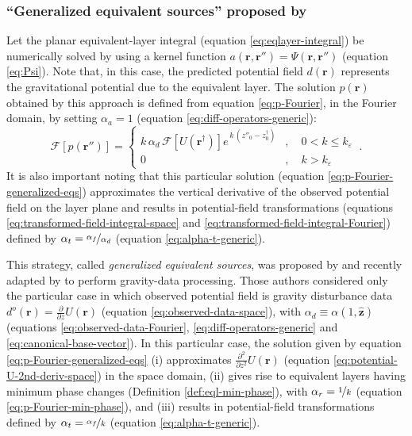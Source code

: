 \subsubsection{``Generalized equivalent sources'' proposed by \citet{cordell1992}}

Let the planar equivalent-layer integral (equation \ref{eq:eqlayer-integral}) be numerically solved by
using a kernel function $a(\mathbf{r}, \mathbf{r}'') = \Psi(\mathbf{r}, \mathbf{r}'')$ (equation \ref{eq:Psi}). 
Note that, in this case, the predicted potential field $d(\mathbf{r})$ 
represents the gravitational potential due to the equivalent layer.
The solution $p(\mathbf{r})$ obtained by this approach is defined from equation \ref{eq:p-Fourier}, in the Fourier domain, 
by setting $\alpha_{a} = 1$ (equation \ref{eq:diff-operators-generic}):
\begin{equation}
	\mathcal{F} [ p(\mathbf{r}'') ] =
	\begin{cases}
		k \, \alpha_{d} \, \mathcal{F} \left[ U(\mathbf{r}^{\dagger}) \right] 
		e^{\, k \, (z''_{0} - z^{\dagger}_{0})} & , 
		\quad 0 < k \le k_{\varepsilon} \\
		0 & , \quad k > k_{\varepsilon} 
	\end{cases} \: .
	\label{eq:p-Fourier-generalized-eqs}
\end{equation}
It is also important noting that 
this particular solution (equation \ref{eq:p-Fourier-generalized-eqs}) approximates the vertical derivative of the observed 
potential field on the layer plane and results in potential-field transformations (equations \ref{eq:transformed-field-integral-space} and 
\ref{eq:transformed-field-integral-Fourier}) defined by $\alpha_{t} = \nicefrac{\alpha_{f}}{\alpha_{d}}$ (equation \ref{eq:alpha-t-generic}).

This strategy, called \textit{generalized equivalent sources}, was proposed by \citet{cordell1992} and recently adapted by 
\citet{soler_uieda2021} to perform gravity-data processing. 
Those authors considered only the particular case in which observed potential field is gravity disturbance data 
$d^{o}(\mathbf{r}) = \tfrac{\partial}{\partial z} U(\mathbf{r})$ (equation \ref{eq:observed-data-space}), 
with $\alpha_{d} \equiv \alpha(1, \hat{\mathbf{z}})$ (equations \ref{eq:observed-data-Fourier}, 
\ref{eq:diff-operators-generic} and \ref{eq:canonical-base-vector}).
In this particular case, the solution given by equation \ref{eq:p-Fourier-generalized-eqs} 
(i) approximates $\tfrac{\partial^{2}}{\partial z^{2}} U(\mathbf{r})$ (equation \ref{eq:potential-U-2nd-deriv-space}) 
in the space domain, 
(ii) gives rise to equivalent layers having minimum phase changes (Definition \ref{def:eql-min-phase}), with 
$\alpha_{r} = \nicefrac{1}{k}$ (equation \ref{eq:p-Fourier-min-phase}), and 
(iii) results in potential-field transformations defined by $\alpha_{t} = \nicefrac{\alpha_{f}}{k}$ (equation \ref{eq:alpha-t-generic}).

